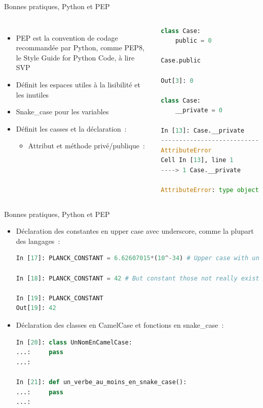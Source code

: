 \documentclass{beamer}
\begin{document}
    \begin{frame}[fragile]{Bonnes pratiques, Python et PEP}
        \begin{columns}
            \begin{itemize}
                \item PEP est la convention de codage recommandée par Python, comme PEP8, le Style Guide for Python Code, à lire SVP
                \item Définit les espaces utiles à la lisibilité et les inutiles
                \item Snake\_case pour les variables
                \item Définit les casses et la déclaration~:
                \begin{itemize}
                    \item Attribut et méthode privé/publique~:
                \end{itemize}
            \end{itemize}
            \begin{lstlisting}[language=python]
class Case:
    public = 0

Case.public

Out[3]: 0

class Case:
    __private = 0

In [13]: Case.__private
---------------------------------------------------------------------------
AttributeError                            Traceback (most recent call last)
Cell In [13], line 1
----> 1 Case.__private

AttributeError: type object 'Case' has no attribute '__private'
            \end{lstlisting}
        \end{columns}
    \end{frame}

    \begin{frame}[fragile]{Bonnes pratiques, Python et PEP}
        \begin{itemize}
            \item Déclaration des constantes en upper case avec underscore, comme la plupart des langages~:
            \begin{lstlisting}[language=python]
In [17]: PLANCK_CONSTANT = 6.62607015*(10^-34) # Upper case with underscore for constants

In [18]: PLANCK_CONSTANT = 42 # But constant those not really exists in Python

In [19]: PLANCK_CONSTANT
Out[19]: 42
            \end{lstlisting}
            \item Déclaration des classes en CamelCase et fonctions en snake\_case~:
            \begin{lstlisting}[language=python]
In [20]: class UnNomEnCamelCase:
...:     pass
...:

In [21]: def un_verbe_au_moins_en_snake_case():
...:     pass
...:
            \end{lstlisting}
        \end{itemize}

    \end{frame}
\end{document}

